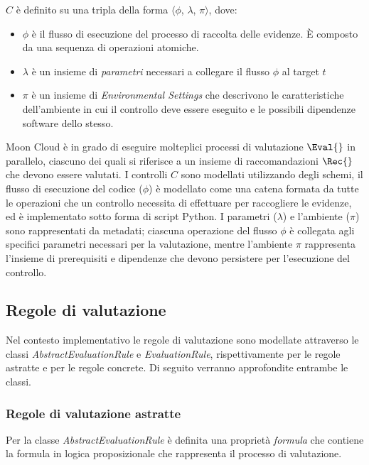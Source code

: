 \documentclass[../main.tex]{subfiles}
\begin{document}
\begin{definition}[\textbf{$C$}]\label{def:control}
$C$ è definito su una tripla della forma $\langle$$\phi$, $\lambda$, $\pi$$\rangle$, dove:
\begin{itemize}
	\item $\phi$ è il flusso di esecuzione del processo di raccolta  delle evidenze. È composto da una sequenza di operazioni atomiche. 
	\item $\lambda$ è un insieme di \textit{parametri} necessari a collegare il flusso $\phi$ al target $t$ 
	\item $\pi$ è un insieme di \textit{Environmental Settings} che descrivono le caratteristiche dell'ambiente in cui il controllo deve essere eseguito e le possibili dipendenze software dello stesso. 
\end{itemize}
\end{definition}

Moon Cloud è in grado di eseguire molteplici processi di valutazione $ \Eval{} $ in parallelo, ciascuno dei quali si riferisce a un insieme di raccomandazioni $\Rec{}$ che devono essere valutati.
I controlli $C$ sono modellati utilizzando degli schemi, il flusso di esecuzione del codice ($\phi$) è modellato come una catena formata da tutte le operazioni che un controllo necessita di effettuare per raccogliere le evidenze, ed è implementato sotto forma di script Python.
I parametri ($\lambda$) e l'ambiente ($\pi$) sono rappresentati da metadati; ciascuna operazione del flusso $\phi$ è collegata agli specifici parametri necessari per la valutazione, mentre l'ambiente $\pi$ rappresenta l'insieme di prerequisiti e dipendenze che devono persistere per l'esecuzione del controllo.


\subsection{Regole di valutazione}
Nel contesto implementativo le regole di valutazione sono modellate attraverso le classi \textit{AbstractEvaluationRule} e \textit{EvaluationRule}, rispettivamente per le regole astratte e per le regole concrete.
Di seguito verranno approfondite entrambe le classi.

\subsubsection{Regole di valutazione astratte}
Per la classe \textit{AbstractEvaluationRule} è definita una proprietà \textit{formula} che contiene la formula in logica proposizionale che rappresenta il processo di valutazione.
\end{document}
